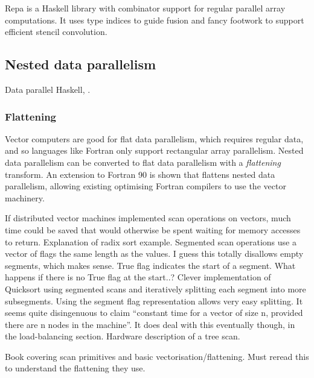 Repa is a Haskell library with combinator support for regular parallel array computations\cite{keller2010regular}.
It uses type indices to guide fusion\cite{lippmeier2012guiding} and fancy footwork to support efficient stencil convolution\cite{lippmeier2011efficient}.


\subsection{Nested data parallelism}
Data parallel Haskell\cite{chakravarty2007data}, \nesl\cite{blelloch1995nesl}.


\subsubsection{Flattening}

Vector computers are good for flat data parallelism, which requires regular data, and so languages like Fortran only support rectangular array parallelism.
Nested data parallelism can be converted to flat data parallelism with a \emph{flattening} transform.
An extension to Fortran 90 is shown that flattens nested data parallelism, allowing existing optimising Fortran compilers to use the vector machinery.

If distributed vector machines implemented scan operations on vectors, much time could be saved that would otherwise be spent waiting for memory accesses to return.
Explanation of radix sort example.
Segmented scan operations use a vector of flags the same length as the values. I guess this totally disallows empty segments, which makes sense. True flag indicates the start of a segment. What happens if there is no True flag at the start..?
Clever implementation of Quicksort using segmented scans and iteratively splitting each segment into more subsegments. Using the segment flag representation allows very easy splitting.
It seems quite disingenuous to claim ``constant time for a vector of size n, provided there are n nodes in the machine''. It does deal with this eventually though, in the load-balancing section.
Hardware description of a tree scan.

Book covering scan primitives and basic vectorisation/flattening.
Must reread this to understand the flattening they use.

